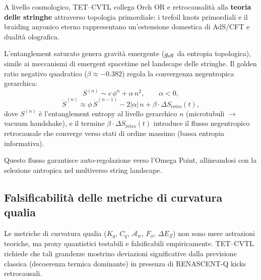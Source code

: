 \documentclass[11pt,a4paper]{article}
\theoremstyle{plain}
\theoremstyle{definition}
\begin{document}
A livello cosmologico, TET–CVTL collega Orch OR e retrocausalità alla \textbf{teoria delle stringhe} attraverso topologia primordiale: i trefoil knots primordiali e il braiding anyonico eterno rappresentano un'estensione domestica di AdS/CFT e dualità olografica. 

\vspace{0.2cm}

L'entanglement saturato genera gravità emergente ($g_{\rm eff}$ da entropia topologica), simile ai meccanismi di emergent spacetime nel landscape delle stringhe. Il golden ratio negativo quadratico ($\beta \approx -0.382$) regola la convergenza negentropica gerarchica:
\begin{equation}
    S^{(n)} \sim c \, \phi^n + \alpha \, n^2, \qquad \alpha < 0,
    \label{eq:golden-entropy}
\end{equation}
\begin{equation}
    \dot{S}^{(n)} \approx \phi \, \dot{S}^{(n-1)} - 2|\alpha| \, n + \beta \cdot \Delta S_{\text{retro}}(t),
    \label{eq:golden-flow}
\end{equation}
dove $S^{(n)}$ è l'entanglement entropy al livello gerarchico $n$ (microtubuli $\to$ vacuum handshake), e il termine $\beta \cdot \Delta S_{\text{retro}}(t)$ introduce il flusso negentropico retrocausale che converge verso stati di ordine massimo (bassa entropia informativa). 

\vspace{0.2cm}

Questo flusso garantisce auto-regolazione verso l'Omega Point, allineandosi con la selezione antropica nel multiverso string landscape.

\vspace{0.3cm}

\subsection{Falsificabilità delle metriche di curvatura qualia}
\label{subsec:falsifiability-qualia-metrics}

\vspace{0.2cm}

Le metriche di curvatura qualia ($K_q$, $C_q$, $\mathcal{A}_w$, $F_{\phi}$, $\Delta E_Z$) non sono mere astrazioni teoriche, ma proxy quantistici testabili e falsificabili empiricamente. TET–CVTL richiede che tali grandezze mostrino deviazioni significative dalla previsione classica (decoerenza termica dominante) in presenza di RENASCENT-Q kicks retrocausali. 
\end{document}
